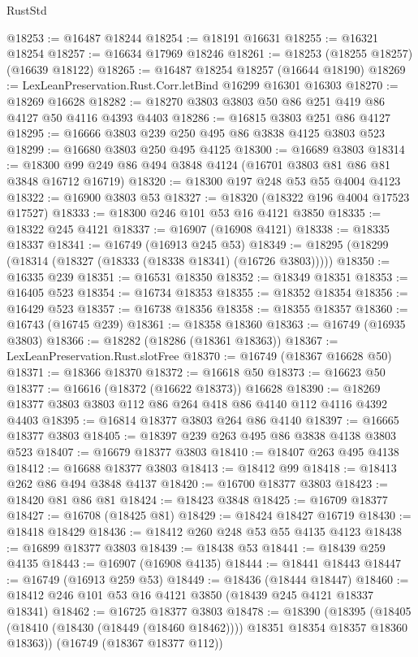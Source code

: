\begin{lexlean}{RustStd}
\begin{coremodule}
@18253 := @16487 @18244
@18254 := @18191 @16631
@18255 := @16321 @18254
@18257 := @16634 @17969 @18246
@18261 := @18253 (@18255 @18257) (@16639 @18122)
@18265 := @16487 @18254 @18257 (@16644 @18190)
@18269 := LexLeanPreservation.Rust.Corr.letBind @16299 @16301 @16303
@18270 := @18269 @16628
@18282 := @18270 @3803 @3803 @50 @86 @251 @419 @86 @4127 @50 @4116 @4393 @4403
@18286 := @16815 @3803 @251 @86 @4127
@18295 := @16666 @3803 @239 @250 @495 @86 @3838 @4125 @3803 @523
@18299 := @16680 @3803 @250 @495 @4125
@18300 := @16689 @3803
@18314 := @18300 @99 @249 @86 @494 @3848 @4124 (@16701 @3803 @81 @86 @81 @3848 @16712 @16719)
@18320 := @18300 @197 @248 @53 @55 @4004 @4123
@18322 := @16900 @3803 @53
@18327 := @18320 (@18322 @196 @4004 @17523 @17527)
@18333 := @18300 @246 @101 @53 @16 @4121 @3850
@18335 := @18322 @245 @4121
@18337 := @16907 (@16908 @4121)
@18338 := @18335 @18337
@18341 := @16749 (@16913 @245 @53)
@18349 := @18295 (@18299 (@18314 (@18327 (@18333 (@18338 @18341) (@16726 @3803)))))
@18350 := @16335 @239
@18351 := @16531 @18350
@18352 := @18349 @18351
@18353 := @16405 @523
@18354 := @16734 @18353
@18355 := @18352 @18354
@18356 := @16429 @523
@18357 := @16738 @18356
@18358 := @18355 @18357
@18360 := @16743 (@16745 @239)
@18361 := @18358 @18360
@18363 := @16749 (@16935 @3803)
@18366 := @18282 (@18286 (@18361 @18363))
@18367 := LexLeanPreservation.Rust.slotFree
@18370 := @16749 (@18367 @16628 @50)
@18371 := @18366 @18370
@18372 := @16618 @50
@18373 := @16623 @50
@18377 := @16616 (@18372 (@16622 @18373)) @16628
@18390 := @18269 @18377 @3803 @3803 @112 @86 @264 @418 @86 @4140 @112 @4116 @4392 @4403
@18395 := @16814 @18377 @3803 @264 @86 @4140
@18397 := @16665 @18377 @3803
@18405 := @18397 @239 @263 @495 @86 @3838 @4138 @3803 @523
@18407 := @16679 @18377 @3803
@18410 := @18407 @263 @495 @4138
@18412 := @16688 @18377 @3803
@18413 := @18412 @99
@18418 := @18413 @262 @86 @494 @3848 @4137
@18420 := @16700 @18377 @3803
@18423 := @18420 @81 @86 @81
@18424 := @18423 @3848
@18425 := @16709 @18377
@18427 := @16708 (@18425 @81)
@18429 := @18424 @18427 @16719
@18430 := @18418 @18429
@18436 := @18412 @260 @248 @53 @55 @4135 @4123
@18438 := @16899 @18377 @3803
@18439 := @18438 @53
@18441 := @18439 @259 @4135
@18443 := @16907 (@16908 @4135)
@18444 := @18441 @18443
@18447 := @16749 (@16913 @259 @53)
@18449 := @18436 (@18444 @18447)
@18460 := @18412 @246 @101 @53 @16 @4121 @3850 (@18439 @245 @4121 @18337 @18341)
@18462 := @16725 @18377 @3803
@18478 := @18390
    (@18395 (@18405 (@18410 (@18430 (@18449 (@18460 @18462)))) @18351 @18354 @18357 @18360 @18363))
    (@16749 (@18367 @18377 @112))

\end{coremodule}
\end{lexlean}
